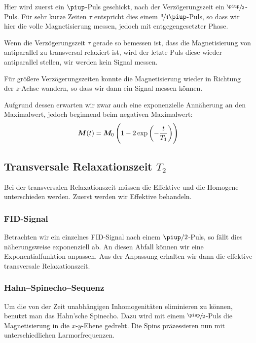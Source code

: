 Hier wird zuerst ein $\piup$-Puls geschickt, nach der Verzögerungszeit ein
$\sfrac\piup2$-Puls. Für sehr kurze Zeiten $\tau$ entspricht dies einem
$\sfrac34\piup$-Puls, so dass wir hier die volle Magnetisierung messen, jedoch
mit entgegengesetzter Phase.

Wenn die Verzögerungszeit $\tau$ gerade so bemessen ist, dass die Magnetisierung von
antiparallel zu transversal relaxiert ist, wird der letzte Puls diese wieder
antiparallel stellen, wir werden kein Signal messen.

Für größere Verzögerungszeiten konnte die Magnetisierung wieder in Richtung der
$z$-Achse wandern, so dass wir dann ein Signal messen können.

Aufgrund dessen erwarten wir zwar auch eine exponenzielle Annäherung an den
Maximalwert, jedoch beginnend beim negativen Maximalwert:
\parencite[Formel~P443.4]{physik412-Anleitung}
\begin{equation}
    \label{eq:M/exp/2}
    \vec M(t) = \vec M_0 \del{1 - 2 \exp\del{- \frac{t}{T_1}}}
\end{equation}

\subsection{Transversale Relaxationszeit $T_2$}

Bei der transversalen Relaxationszeit müssen die Effektive und die Homogene
unterschieden werden. Zuerst werden wir Effektive behandeln.

\subsubsection{FID-Signal}

Betrachten wir ein einzelnes FID-Signal nach einem $\piup/2$-Puls, so fällt dies
näherungsweise exponenziell ab. An diesen Abfall können wir eine
Exponentialfunktion anpassen. Aus der Anpassung erhalten wir dann die effektive
transversale Relaxationszeit.

\subsubsection{Hahn–Spinecho–Sequenz}

Um die von der Zeit unabhängigen Inhomogenitäten eliminieren zu können, benutzt
man das Hahn'sche Spinecho. Dazu wird mit einem $\sfrac\piup2$-Puls die
Magnetisierung in die $x$-$y$-Ebene gedreht. Die Spins präzessieren nun mit
unterschiedlichen Larmorfrequenzen.

